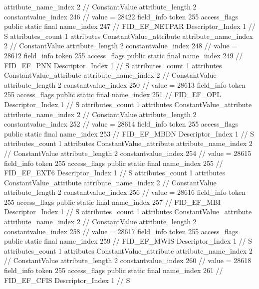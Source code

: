 {{{{{{{					attribute_name_index	2		// ConstantValue
					attribute_length	2
					constantvalue_index	246		// value = 28422
				}
				}
			}
			field_info {
				token	255
				access_flags	public static final
				name_index	247		// FID_EF_NETPAR
				Descriptor_Index	1		// S
				attributes_count	1
				attributes {
				ConstantValue_attribute {
					attribute_name_index	2		// ConstantValue
					attribute_length	2
					constantvalue_index	248		// value = 28612
				}
				}
			}
			field_info {
				token	255
				access_flags	public static final
				name_index	249		// FID_EF_PNN
				Descriptor_Index	1		// S
				attributes_count	1
				attributes {
				ConstantValue_attribute {
					attribute_name_index	2		// ConstantValue
					attribute_length	2
					constantvalue_index	250		// value = 28613
				}
				}
			}
			field_info {
				token	255
				access_flags	public static final
				name_index	251		// FID_EF_OPL
				Descriptor_Index	1		// S
				attributes_count	1
				attributes {
				ConstantValue_attribute {
					attribute_name_index	2		// ConstantValue
					attribute_length	2
					constantvalue_index	252		// value = 28614
				}
				}
			}
			field_info {
				token	255
				access_flags	public static final
				name_index	253		// FID_EF_MBDN
				Descriptor_Index	1		// S
				attributes_count	1
				attributes {
				ConstantValue_attribute {
					attribute_name_index	2		// ConstantValue
					attribute_length	2
					constantvalue_index	254		// value = 28615
				}
				}
			}
			field_info {
				token	255
				access_flags	public static final
				name_index	255		// FID_EF_EXT6
				Descriptor_Index	1		// S
				attributes_count	1
				attributes {
				ConstantValue_attribute {
					attribute_name_index	2		// ConstantValue
					attribute_length	2
					constantvalue_index	256		// value = 28616
				}
				}
			}
			field_info {
				token	255
				access_flags	public static final
				name_index	257		// FID_EF_MBI
				Descriptor_Index	1		// S
				attributes_count	1
				attributes {
				ConstantValue_attribute {
					attribute_name_index	2		// ConstantValue
					attribute_length	2
					constantvalue_index	258		// value = 28617
				}
				}
			}
			field_info {
				token	255
				access_flags	public static final
				name_index	259		// FID_EF_MWIS
				Descriptor_Index	1		// S
				attributes_count	1
				attributes {
				ConstantValue_attribute {
					attribute_name_index	2		// ConstantValue
					attribute_length	2
					constantvalue_index	260		// value = 28618
				}
				}
			}
			field_info {
				token	255
				access_flags	public static final
				name_index	261		// FID_EF_CFIS
				Descriptor_Index	1		// S
}}}}}
